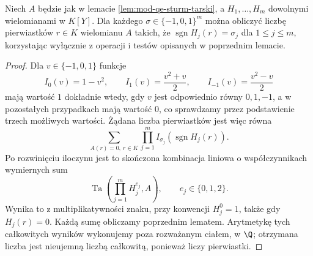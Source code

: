 \begin{lemat}
\label{lem:mod-qe-rcf-sign-determination}
Niech $A$ będzie jak w lemacie \ref{lem:mod-qe-sturm-tarski},
a $H_1,\ldots,H_m$ dowolnymi wielomianami w $K[Y]$.
Dla każdego $\sigma\in\{-1,0,1\}^m$ można obliczyć
liczbę pierwiastków $r\in K$ wielomianu $A$ takich, że
$\operatorname{sgn}H_j(r)=\sigma_j$ dla $1\leq j\leq m$,
korzystając wyłącznie z operacji i testów opisanych
w poprzednim lemacie.
\end{lemat}
\begin{proof}
Dla $v\in\{-1,0,1\}$ funkcje
\[
I_0(v)=1-v^2,\qquad
I_1(v)=\frac{v^2+v}{2},\qquad
I_{-1}(v)=\frac{v^2-v}{2}
\]
mają wartość $1$ dokładnie wtedy, gdy $v$ jest
odpowiednio równy $0,1,-1$, a w pozostałych
przypadkach mają wartość $0$, co sprawdzamy
przez podstawienie trzech możliwych wartości.
Żądana liczba pierwiastków jest więc równa
\[
\sum_{A(r)=0,\ r\in K}
\prod_{j=1}^m I_{\sigma_j}(\operatorname{sgn}H_j(r)).
\]
Po rozwinięciu iloczynu jest to skończona kombinacja
liniowa o współczynnikach wymiernych sum
\[
\operatorname{Ta}\left(\prod_{j=1}^m H_j^{e_j},A\right),
\qquad e_j\in\{0,1,2\}.
\]
Wynika to z multiplikatywności znaku, przy konwencji
$H_j^0=1$, także gdy $H_j(r)=0$.
Każdą sumę obliczamy poprzednim lematem.
Arytmetykę tych całkowitych wyników wykonujemy poza
rozważanym ciałem, w $\Q$; otrzymana liczba jest
nieujemną liczbą całkowitą, ponieważ liczy pierwiastki.
\end{proof}

